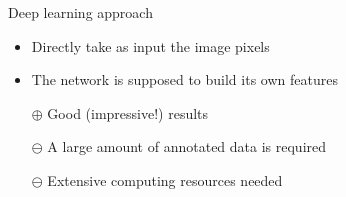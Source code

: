 \documentclass[xcolor=pdftex,dvipsnames,table,mathserif]{beamer}
\begin{document}
\begin{frame}{Deep learning approach}

  \begin{block}{}
    \begin{itemize}
    \item Directly take as input the image pixels
    \item The network is supposed to build its own features
    \end{itemize}
  \end{block}

  \begin{itemize}
  \item[$\oplus$] Good (impressive!) results
  \item[$\ominus$] A large amount of annotated data is required
  \item[$\ominus$] Extensive computing resources needed
  \end{itemize}

\end{frame}

\end{document}

